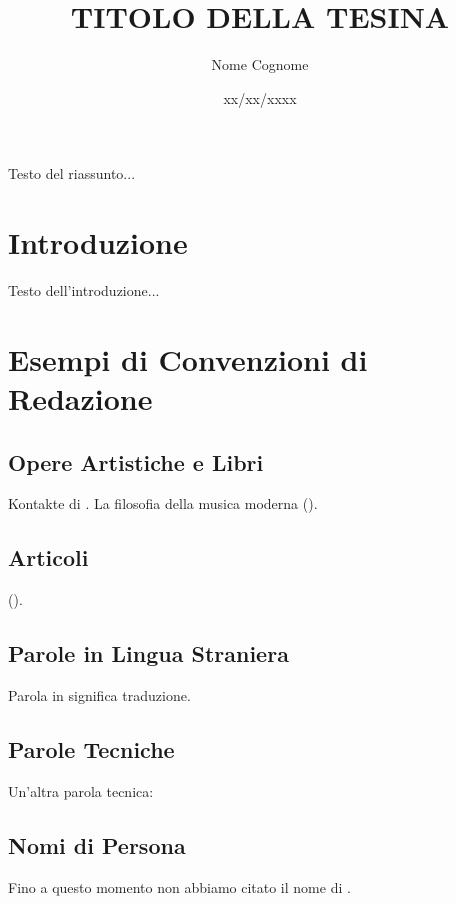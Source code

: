 \documentclass[a4paper,12pt]{article}
\title{\fontsize{14}{17}\bfseries\uppercase{Titolo della Tesina}}
\author{Nome Cognome}
\date{xx/xx/xxxx}
\begin{document}
\maketitle
\thispagestyle{empty}

\begin{center}
    \vspace{1cm}
    \textbf{\fontsize{12}{15}\selectfont{Riassunto}}
\end{center}

Testo del riassunto...

\tableofcontents  

\newpage

\section{Introduzione}
Testo dell'introduzione...

\section{Esempi di Convenzioni di Redazione}

\subsection{Opere Artistiche e Libri}
Kontakte di . La filosofia della musica moderna ().

\subsection{Articoli}
 ().

\subsection{Parole in Lingua Straniera}
Parola in  significa traduzione.

\subsection{Parole Tecniche}
Un'altra parola tecnica: 
\subsection{Nomi di Persona}
Fino a questo momento non abbiamo citato il nome di .
\end{document}
